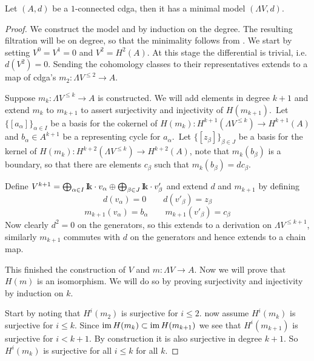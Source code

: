 \begin{theorem}
	Let $(A, d)$ be a $1$-connected cdga, then it has a minimal model $(\Lambda V, d)$.
\end{theorem}
\begin{proof}
	We construct the model and by induction on the degree. The resulting filtration will be on degree, so that the minimality follows from . We start by setting $V^0 = V^1 = 0$ and $V^2 = H^2(A)$. At this stage the differential is trivial, i.e. $d(V^2) = 0$. Sending the cohomology classes to their representatives extends to a map of cdga's $m_2 : \Lambda V^{\leq 2} \to A$.

	Suppose $m_k : \Lambda V^{\leq k} \to A$ is constructed. We will add elements in degree $k+1$ and extend $m_k$ to $m_{k+1}$ to assert surjectivity and injectivity of $H(m_{k+1})$.\, Let $\{ [a_\alpha] \}_{\alpha \in I}$ be a basis for the cokernel of $H(m_k) : H^{k+1}(\Lambda V^{\leq k}) \to H^{k+1}(A)$ and $b_\alpha \in A^{k+1}$ be a representing cycle for $a_\alpha$.\, Let $\{ [z_\beta] \}_{\beta \in J}$ be a basis for the kernel of $H(m_k) : H^{k+2}(\Lambda V^{\leq k}) \to H^{k+2}(A)$, note that $m_k(b_\beta)$ is a boundary, so that there are elements $c_\beta$ such that $m_k(b_\beta) = d c_\beta$.

	Define $V^{k+1} = \bigoplus_{\alpha \in I} \mathrm{I\!k} \cdot v_\alpha \oplus \bigoplus_{\beta \in J} \mathrm{I\!k} \cdot v'_\beta$ and extend $d$ and $m_{k+1}$ by defining
	\[ d(v_\alpha) = 0 \qquad d(v'_\beta) = z_\beta \]
	\[ m_{k+1}(v_\alpha) = b_\alpha \qquad m_{k+1}(v'_\beta) = c_\beta \]
	Now clearly $d^2=0$ on the generators, so this extends to a derivation on $\Lambda V^{\leq k+1}$, similarly $m_{k+1}$ commutes with $d$ on the generators and hence extends to a chain map.

	This finished the construction of $V$ and $m : \Lambda V \to A$. Now we will prove that $H(m)$ is an isomorphism. We will do so by proving surjectivity and injectivity by induction on $k$.

	Start by noting that $H^i(m_2)$ is surjective for $i \leq 2$. now assume $H^i(m_k)$ is surjective for $i \leq k$. Since $\operatorname*{im} H(m_k) \subset \operatorname*{im} H(m_{k+1})$ we see that $H^i(m_{k+1})$ is surjective for $i < k+1$. By construction it is also surjective in degree $k+1$. So $H^i(m_k)$ is surjective for all $i \leq k$ for all $k$.


\end{proof}
